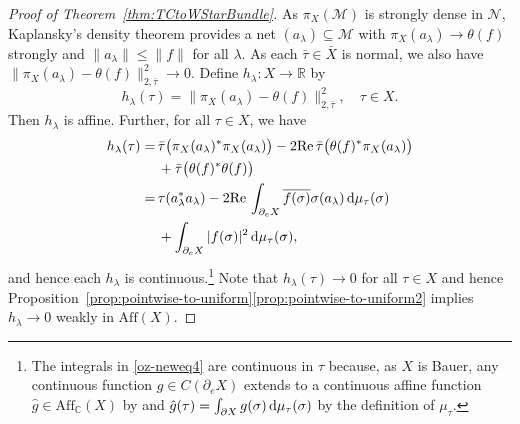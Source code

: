 \documentclass[a4paper,11pt]{amsart}
\theoremstyle{definition}
\numberwithin{equation}{section}
\numberwithin{theorem}{section}
\newcommand{\C}{\mathbb C}
\begin{document}
\begin{proof}[Proof of Theorem~\ref{thm:TCtoWStarBundle}]
As $\pi_X(\mathcal M)$ is strongly dense in $\mathcal N$, Kaplansky's density theorem provides a net $(a_\lambda) \subseteq \mathcal M$ with $\pi_X(a_\lambda) \rightarrow \theta(f)$ strongly and $\|a_\lambda\| \leq \|f\|$ for all $\lambda$.  As each $\bar \tau \in \bar X$ is normal, we also have $\|\pi_X(a_\lambda) - \theta(f)\|_{2, \bar \tau}^2 \rightarrow 0$.  Define $h_\lambda \colon X \rightarrow \mathbb R$ by 
\begin{equation}
    h_\lambda(\tau) = \|\pi_X(a_\lambda) - \theta(f)\|_{2, \bar\tau}^2, \quad \tau \in X. 
\end{equation}
Then $h_\lambda$ is affine.  Further, for all $\tau \in X$, we have
\begin{equation}\label{oz-neweq4}
\begin{alignedat}{2}
    h_\lambda(\tau) &= &\, &\bar\tau\big(\pi_X(a_\lambda)^*\pi_X(a_\lambda)\big) - 2 \mathrm{Re} \,\bar\tau\big(\theta(f)^* \pi_X(a_\lambda)\big) \\ & &&+ \bar\tau\big(\theta(f)^*\theta(f)\big) \\
    &= &&\tau(a_\lambda^*a_\lambda) - 2 \mathrm{Re} \,\int_{\partial_e X} \overline{f(\sigma)} \sigma(a_\lambda) \, {\rm d}\mu_\tau(\sigma) \\ & &&+ \int_{\partial_e X} |f(\sigma)|^2 \, {\rm d}\mu_{\tau}(\sigma),
\end{alignedat}
\end{equation}
and hence each $h_\lambda$ is continuous.\footnote{The integrals in \eqref{oz-neweq4} are continuous in $\tau$ because, as $X$ is Bauer, any continuous function $g\in C(\partial_e X)$ extends to a continuous affine function $\hat{g} \in \mathrm{Aff}_\C(X)$ by \cite[Theorem II.4.1]{Alf71} and $\hat{g}(\tau) = \int_{\partial X} g(\sigma)\, {\rm d}\mu_\tau(\sigma)$ by the definition of $\mu_\tau$.}
Note that $h_\lambda(\tau) \rightarrow 0$ for all $\tau \in X$ and hence Proposition~\ref{prop:pointwise-to-uniform}\ref{prop:pointwise-to-uniform2} implies $h_\lambda \rightarrow 0$ weakly in $\mathrm{Aff}(X)$.


\end{proof}
\end{document}
